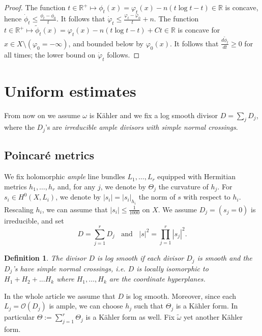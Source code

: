 \documentclass[10pt,a4paper]{amsart}
\numberwithin{equation}{section}
\newtheorem{defi}[theorem]{Definition}
\newcommand{\R}{\mathbb R}
\newcommand{\f}{\varphi}
\begin{document}
\begin{proof}
\smallskip


The function $t \in \R^+ \mapsto {\phi}_t(x)=\f_t(x)-n(t\log t-t) \in \R$  is concave,
hence $\dot{\phi}_t\leq \frac{\phi_t-\phi_0}{t}$. It follows that $\dot{\f}_t\leq \frac{\f_t-\f_0}{t}+n$.
The function  $t \in \R^+ \mapsto \tilde{\phi}_t(x)=\f_t(x)-n(t\log t-t) +C t \in \R$ is concave 
for   $x \in X \setminus (\f_0=-\infty)$,  and bounded below by $\f_0(x)$.
It follows 
that $\frac{d \tilde{\phi}_t}{dt} \geq 0$ 
for all times; the lower bound on $\dot{\varphi}_t$ follows.
\end{proof}
 
 
 
 
 
 
 
 
 \section{Uniform estimates} \label{sec:uniform}
 
  From now on we assume $\omega$ is K\"ahler and we fix a log smooth divisor $D=\sum_j D_j$, where the $D_j$'s are 
  {\it irreducible ample divisors with simple normal crossings}.
 
  
 
 

\subsection{Poincaré metrics} \label{subsect: Poincare}

  

We fix holomorphic \emph{ample} line bundles $L_1,\ldots,L_r$ equipped with Hermitian metrics $h_1,\ldots,h_r$ and, for any $j$, we denote by $\Theta_j$ the curvature of $h_j$.
For $s_i \in H^0(X,L_i)$, we denote by $|s_i|=|s_i|_{h_i}$ the norm of $s$ with respect to  $h_i$. 
Rescaling $h_i$, we can assume that $|s_i|\leq \frac{1}{1000}$ on $X$. 
We assume  $D_j=(s_j=0)$ is irreducible, and set
$$
D=\sum_{j=1}^r D_j
\; \; \text{ and } \; \;
|s|^2=\prod_{j=1}^r |s_j|^2.
$$

\begin{defi}
The divisor $D$ is {\it log smooth} if each divisor $D_j$ is smooth and the $D_j$'s have simple normal crossings,
 i.e. $D$ is locally isomorphic to $H_1 + H_2 + ...H_k$ where 
 $H_1,\ldots,H_k$ are the coordinate hyperplanes.  
\end{defi}

In the whole article we assume that $D$ is log smooth. Moreover, since each $L_j=\mathcal{O}(D_j)$ is ample, we can choose $h_j$ such that $ \Theta_j$ is a K\"ahler form. In particular $ \Theta:=\sum_{j=1}^r \Theta_j$ is a K\"ahler form as well. 
Fix $\tilde{\omega}$ yet another K\"ahler form.
\end{document}
